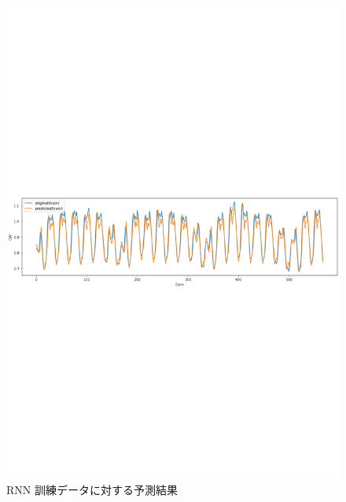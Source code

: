 \begin{figure}[ht]
\begin{center}
\includegraphics[scale=0.6]{rnn_pred_month.pdf}
\end{center}
\vspace{-80mm}
\caption{RNN 訓練データに対する予測結果}
\end{figure}

